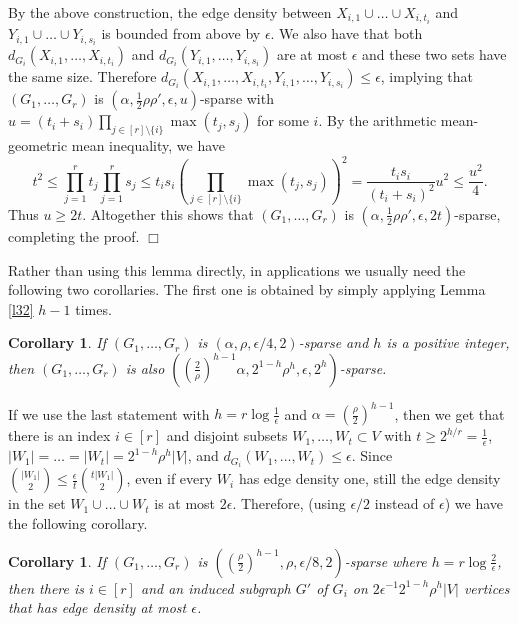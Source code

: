 \documentclass[11pt]{article}
\newenvironment{proof}
      {\medskip\noindent{\bf Proof.}\hspace{1mm}}
      {\hfill$\Box$\medskip}
\newtheorem{corollary}[theorem]{Corollary}
\begin{document}
\begin{proof}
By the above construction, the edge density between
$X_{i,1}\cup \ldots \cup X_{i,t_i}$ and $Y_{i,1}\cup \ldots \cup Y_{i,s_i}$
is bounded from above by $\epsilon$. We also have that both
 $d_{G_i}(X_{i,1},\ldots,X_{i,t_i})$ and $d_{G_i}(Y_{i,1},\ldots,Y_{i,s_i})$ are at most $\epsilon$
and these two sets have the same size.
Therefore $d_{G_i}(X_{i,1},\ldots,X_{i,t_i},Y_{i,1},\ldots,Y_{i,s_i}) \leq \epsilon$, implying
that $(G_1,\ldots,G_r)$ is
$\left(\alpha,\frac{1}{2}\rho\rho',\epsilon,u\right)$-sparse with
$u=(t_i+s_i)\prod_{j \in [r]\setminus \{i\}}\max(t_j,s_j)$ for some $i$.
By the arithmetic mean-geometric mean inequality, we have
$$t^2 \leq \prod_{j=1}^r t_j \prod_{j=1}^r s_j \leq
t_is_i\left(\prod_{j \in [r]\setminus \{i\}} \max(t_j,s_j)\right)^2
=\frac{t_is_i}{(t_i+s_i)^2}u^2 \leq \frac{u^2}{4}.$$
Thus $u \geq 2t$. Altogether this shows that $(G_1,\ldots,G_r)$ is
$\left(\alpha,\frac{1}{2}\rho\rho',\epsilon,2t\right)$-sparse, completing the proof.
\end{proof}

Rather than using this lemma directly, in applications we usually need the following two
corollaries. The first one is obtained by simply applying Lemma \ref{l32} $h-1$ times.

\begin{corollary}\label{secondcor}
If $(G_1,\ldots,G_r)$ is $(\alpha,\rho,\epsilon/4,2)$-sparse and $h$
is a positive integer, then $(G_1,\ldots,G_r)$ is also
$\left((\frac{2}{\rho})^{h-1}\alpha,2^{1-h}\rho^{h},\epsilon,2^h\right)$-sparse.
\end{corollary}

If we use the last statement with $h=r\log \frac{1}{\epsilon}$ and $\alpha=(\frac{\rho}{2})^{h-1}$,
then we get that there is an index $i \in [r]$ and disjoint
subsets $W_1,\ldots,W_{t} \subset V$ with $t \geq 2^{h/r}=
\frac{1}{\epsilon}$, $|W_1|=\ldots=|W_t|= 2^{1-h}\rho^{h}|V|$,
and $d_{G_i}(W_1,\ldots,W_t) \leq \epsilon$. Since
${|W_1| \choose 2} \leq \frac{\epsilon}{t}{t|W_1| \choose 2}$, even if every $W_i$ has edge density one, still the edge density in the
set $W_1 \cup \ldots \cup W_t$ is at most $2\epsilon$. Therefore, (using $\epsilon/2$ instead of $\epsilon$) we
have the following corollary.

\begin{corollary}\label{corbip}
If $(G_1,\ldots,G_r)$ is
$((\frac{\rho}{2})^{h-1},\rho,\epsilon/8,2)$-sparse where $h=r\log \frac{2}{\epsilon}$,
then there is $i \in [r]$ and an
induced subgraph $G'$ of $G_i$ on
$2\epsilon^{-1}2^{1-h}\rho^{h}|V|$ vertices that has edge density at
most $\epsilon$.
\end{corollary}
\end{document}
